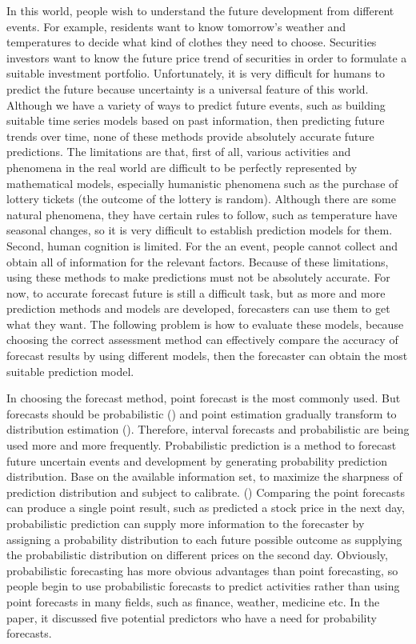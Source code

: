 \documentclass{monashthesis}
\theoremstyle{definition}
\theoremstyle{definition}
\theoremstyle{definition}
\theoremstyle{remark}
\begin{document}
In this world, people wish to understand the future development from
different events. For example, residents want to know tomorrow's weather
and temperatures to decide what kind of clothes they need to choose.
Securities investors want to know the future price trend of securities
in order to formulate a suitable investment portfolio. Unfortunately, it
is very difficult for humans to predict the future because uncertainty
is a universal feature of this world. Although we have a variety of ways
to predict future events, such as building suitable time series models
based on past information, then predicting future trends over time, none
of these methods provide absolutely accurate future predictions. The
limitations are that, first of all, various activities and phenomena in
the real world are difficult to be perfectly represented by mathematical
models, especially humanistic phenomena such as the purchase of lottery
tickets (the outcome of the lottery is random). Although there are some
natural phenomena, they have certain rules to follow, such as
temperature have seasonal changes, so it is very difficult to establish
prediction models for them. Second, human cognition is limited. For the
an event, people cannot collect and obtain all of information for the
relevant factors. Because of these limitations, using these methods to
make predictions must not be absolutely accurate. For now, to accurate
forecast future is still a difficult task, but as more and more
prediction methods and models are developed, forecasters can use them to
get what they want. The following problem is how to evaluate these
models, because choosing the correct assessment method can effectively
compare the accuracy of forecast results by using different models, then
the forecaster can obtain the most suitable prediction model.

In choosing the forecast method, point forecast is the most commonly
used. But forecasts should be probabilistic (\textcite{GK14}) and point
estimation gradually transform to distribution estimation
(\textcite{S75}). Therefore, interval forecasts and probabilistic are
being used more and more frequently. Probabilistic prediction is a
method to forecast future uncertain events and development by generating
probability prediction distribution. Base on the available information
set, to maximize the sharpness of prediction distribution and subject to
calibrate. (\textcite{GK14}) Comparing the point forecasts can produce a
single point result, such as predicted a stock price in the next day,
probabilistic prediction can supply more information to the forecaster
by assigning a probability distribution to each future possible outcome
as supplying the probabilistic distribution on different prices on the
second day. Obviously, probabilistic forecasting has more obvious
advantages than point forecasting, so people begin to use probabilistic
forecasts to predict activities rather than using point forecasts in
many fields, such as finance, weather, medicine etc. In the
\textcite{R16} paper, it discussed five potential predictors who have a
need for probability forecasts.
\end{document}
